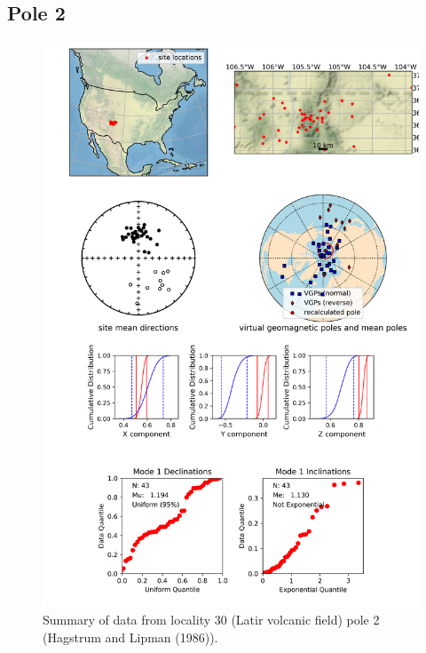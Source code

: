 \documentclass{article}
\begin{document}
\subsection{Pole 2}


\begin{figure}[H]
\centering
\includegraphics[width=5 in]{./30/2/pole_summary.png}
\caption{Summary of data from locality 30 (Latir volcanic field) pole 2 (Hagstrum and Lipman (1986)).}
\end{figure}
\end{document}
